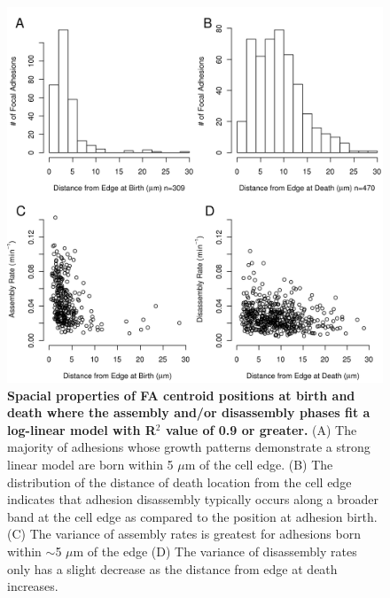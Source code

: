 \begin{figure}[htbp]
\begin{center}
\includegraphics[width=\textwidth]{../figures/spacial/spacial}
\end{center}
\caption{
{\bf Spacial properties of FA centroid positions at birth and death where the assembly and/or disassembly phases fit a log-linear model with R$^2$ value of 0.9 or greater.} (A) The majority of adhesions whose growth patterns demonstrate a strong linear model are born within 5 $\mu$m of the cell edge. (B) The distribution of the distance of death location from the cell edge indicates that adhesion disassembly typically occurs along a broader band at the cell edge as compared to the position at adhesion birth. (C) The variance of assembly rates is greatest for adhesions born within $\sim$5 $\mu$m of the edge (D) The variance of disassembly rates only has a slight decrease as the distance from edge at death increases.
}
\label{spacial}
\end{figure}

